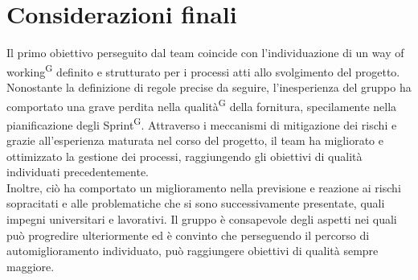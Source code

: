 \documentclass[8pt]{article}
\newcommand{\glossterm}[1]{#1\textsuperscript{G}} %
\begin{document}
\section{Considerazioni finali}\label{sec:considerazioni}
Il primo obiettivo perseguito dal team coincide con l'individuazione di un \glossterm{way of working} definito e strutturato per i processi atti allo svolgimento del progetto.\\
Nonostante la definizione di regole precise da seguire, l'inesperienza del gruppo ha
comportato una grave perdita nella \glossterm{qualità} della fornitura, specilamente nella pianificazione degli \glossterm{Sprint}.
Attraverso i meccanismi di mitigazione dei rischi e grazie all'esperienza maturata nel corso del progetto, il team ha migliorato e ottimizzato la gestione dei processi, raggiungendo gli obiettivi di qualità individuati precedentemente.\\
Inoltre, ciò ha comportato un miglioramento nella previsione e reazione ai rischi sopracitati e alle problematiche che si sono successivamente presentate, quali impegni universitari e lavorativi.
Il gruppo è consapevole degli aspetti nei quali può progredire ulteriormente ed è convinto che perseguendo il percorso di automiglioramento individuato, può raggiungere obiettivi di qualità sempre maggiore.
\end{document}
